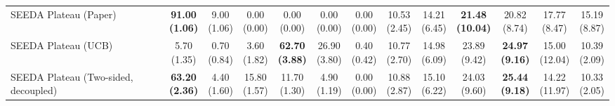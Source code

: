 \begin{table}[H]
{\begin{tabular}{l|cccccc|cccccc}
SEEDA Plateau (Paper) & \bfseries \makecell{91.00 \\ (1.06)} & \makecell{9.00 \\ (1.06)} & {\cellcolor[HTML]{C8E6C9}} \makecell{0.00 \\ (0.00)} & \makecell{0.00 \\ (0.00)} & \makecell{0.00 \\ (0.00)} & \makecell{0.00 \\ (0.00)} & \makecell{10.53 \\ (2.45)} & \makecell{14.21 \\ (6.45)} & {\cellcolor[HTML]{C8E6C9}} \bfseries \makecell{21.48 \\ (10.04)} & \makecell{20.82 \\ (8.74)} & \makecell{17.77 \\ (8.47)} & \makecell{15.19 \\ (8.87)} \\
SEEDA Plateau (UCB) & \makecell{5.70 \\ (1.35)} & \makecell{0.70 \\ (0.84)} & {\cellcolor[HTML]{C8E6C9}} \makecell{3.60 \\ (1.82)} & \bfseries \makecell{62.70 \\ (3.88)} & \makecell{26.90 \\ (3.80)} & \makecell{0.40 \\ (0.42)} & \makecell{10.77 \\ (2.70)} & \makecell{14.98 \\ (6.09)} & {\cellcolor[HTML]{C8E6C9}} \makecell{23.89 \\ (9.42)} & \bfseries \makecell{24.97 \\ (9.16)} & \makecell{15.00 \\ (12.04)} & \makecell{10.39 \\ (2.09)} \\
SEEDA Plateau (Two-sided, decoupled) & \bfseries \makecell{63.20 \\ (2.36)} & \makecell{4.40 \\ (1.60)} & {\cellcolor[HTML]{C8E6C9}} \makecell{15.80 \\ (1.57)} & \makecell{11.70 \\ (1.30)} & \makecell{4.90 \\ (1.19)} & \makecell{0.00 \\ (0.00)} & \makecell{10.88 \\ (2.87)} & \makecell{15.10 \\ (6.22)} & {\cellcolor[HTML]{C8E6C9}} \makecell{24.03 \\ (9.60)} & \bfseries \makecell{25.44 \\ (9.18)} & \makecell{14.22 \\ (11.97)} & \makecell{10.33 \\ (2.05)} \\

\end{tabular}}
\end{table}
